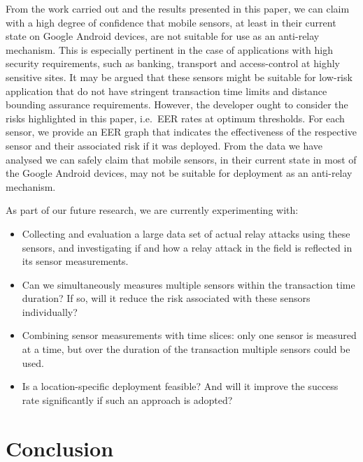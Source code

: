 \documentclass{article}
\begin{document}
From the work carried out and the results presented in this paper, we can claim with a high degree of confidence that mobile sensors, at least in their current state on Google Android devices, are not suitable for use as an anti-relay mechanism.  This is especially pertinent in the case of applications with high security requirements, such as banking, transport and access-control at highly sensitive sites. It may be argued that these sensors might be suitable for low-risk application that do not have stringent transaction time limits and distance bounding assurance requirements.  However, the developer ought to consider the risks highlighted in this paper, i.e.\ EER rates at optimum thresholds.  For each sensor, we provide an EER graph that indicates the effectiveness of the respective sensor and their associated risk if it was deployed.  From the data we have analysed we can safely claim that mobile sensors, in their current state in most of the Google Android devices, may not be suitable for deployment as an anti-relay mechanism.

As part of our future research, we are currently experimenting with:

\begin{itemize}
\item Collecting and evaluation a large data set of actual relay attacks using these sensors, and investigating if and how a relay attack in the field is reflected in its sensor measurements.
\item Can we simultaneously measures multiple sensors within the transaction time duration?  If so, will it reduce the risk associated with these sensors individually?
\item Combining sensor measurements with time slices: only one sensor is measured at a time, but over the duration of the transaction multiple sensors could be used.
\item Is a location-specific deployment feasible? And will it improve the success rate significantly if such an approach is adopted?
\end{itemize}

\section{Conclusion}
\end{document}
